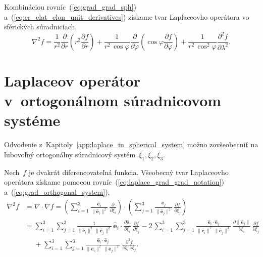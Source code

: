 \documentclass[a4paper, 12pt]{book}
\let\vec\mathbf
\begin{document}
%
Kombináciou rovníc~(\ref{eq:grad_grad_sph}) 
a~(\ref{eq:er_elat_elon_unit_derivatives}) získame tvar Laplaceovho operátora 
vo sférických súradniciach,
%
\begin{equation}
\label{eq:laplace_sph}
\nabla^2 f = \frac{1}{r^2} \frac{\partial}{\partial r} \left( r^2
\frac{\partial f}{\partial r} \right) + \frac{1}{r^2 \, \cos\varphi}
\frac{\partial}{\partial \varphi} \left( \cos\varphi \frac{\partial f}{\partial 
\varphi} \right) + \frac{1}{r^2 \,
\cos^2\varphi}\frac{\partial^2 f}{\partial \lambda^2}{.}
\end{equation}




\section{Laplaceov operátor v~ortogonálnom súradnicovom systéme}
\label{app:laplace_in_orthogonal_coordinates}

Odvodenie z~Kapitoly~\ref{app:laplace_in_spherical_system} možno zovšeobecniť 
na ľubovoľný ortogonálny súradnicový systém~$\xi_1, \xi_2, \xi_3$.

Nech~$f$ je dvakrát diferencovateľná funkcia.  Všeobecný tvar Laplaceovho 
operátora získame pomocou rovníc~(\ref{eq:laplace_grad_grad_notation}) 
a~(\ref{eq:grad_orthogonal_system}),
%
\begin{equation}
\label{eq:laplace_orthogonal_system_1}
\begin{split}
\nabla^2 f &= \nabla \cdot \nabla f = \left( \sum_{i = 1}^3 \frac{\hat{\vec 
e}_i}{\| \hat{\vec e}_i \|^2} \, \frac{\partial}{\partial \xi_i}\right) \cdot 
\left( \sum_{j = 1}^3 \frac{\hat{\vec e}_j}{\| \hat{\vec e}_j \|^2} \, 
\frac{\partial f}{\partial \xi_j}
\right)\\
%
&= \sum_{i = 1}^{3} \sum_{j = 1}^3 \frac{1}{\| \hat{\vec e}_i \|^2 \, \| 
\hat{\vec e}_j \|^2} \, \hat{\vec e}_i \cdot \frac{\partial \hat{\vec 
e}_j}{\partial \xi_i} \, \frac{\partial f}{\partial \xi_j}
- 2\, \sum_{i = 1}^{3} \sum_{j = 1}^3 \frac{\hat{\vec e}_i \cdot \hat{\vec 
e}_j}{\| \hat{\vec e}_i \|^2 \, \|\hat{\vec e}_j \|^3} \, \frac{\partial \| 
\hat{\vec e}_j \|}{\partial \xi_i} \, \frac{\partial f}{\partial \xi_j}\\
%
&\phantom{={}}+ \sum_{i = 1}^{3} \sum_{j = 1}^3 \frac{\hat{\vec e}_i \cdot 
\hat{\vec e}_j}{\| \hat{\vec e}_i \|^2 \, \| \hat{\vec e}_j \|^2} \, 
\frac{\partial^2 f}{\partial \xi_i \, \partial \xi_j}{.}
\end{split}
%
\end{equation}
\end{document}
